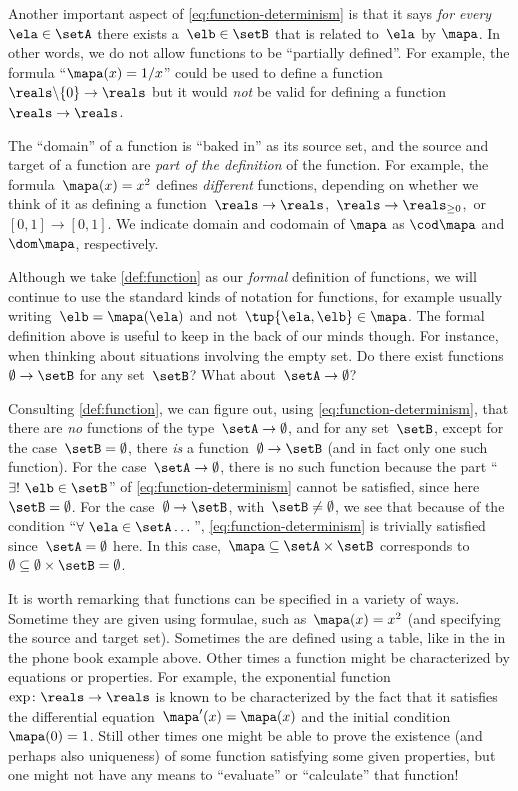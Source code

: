 Another important aspect of \cref{eq:function-determinism} is that it says \emph{for every}~$\ela \in \setA$ there exists a~$\elb \in \setB$ that is related to~$\ela$ by $\mapa$.
In other words, we do not allow functions to be ``partially defined''.
For example, the formula ``$\mapa(x) = 1/x$'' could be used to define a function~$\reals \backslash \{ 0 \} \to \reals$ but it would \emph{not} be valid for defining a function~$\reals \to \reals$.

\label{sec:domain-codomain}
The ``domain'' of a function is ``baked in'' as its source set, and the source and target of a function are \emph{part of the definition} of the function.
For example, the formula~$\mapa(x) = x^2$ defines \emph{different} functions, depending on whether we think of it as defining a function~$\reals \to \reals$,~$\reals \to \reals_{\geq 0}$,~or $[0,1] \to [0,1]$.
We indicate domain and codomain of $\mapa$ as $\cod\mapa$ and $\dom\mapa$, respectively.


Although we take \cref{def:function} as our \emph{formal} definition of functions, we will continue to use the standard kinds of notation for functions, for example usually writing~$\elb = \mapa(\ela)$ and not~$\tup{\ela, \elb} \in \mapa$.
The formal definition above is useful to keep in the back of our minds though.
For instance, when thinking about situations involving the empty set.
Do there exist functions~$\emptyset \to \setB$ for any set~$\setB$? What about~$\setA \to \emptyset$?

Consulting \cref{def:function}, we can figure out, using \cref{eq:function-determinism}, that there are \emph{no} functions of the type~$\setA \to \emptyset$, and for any set~$\setB$, except for the case~$\setB = \emptyset$, there \emph{is} a function~$\emptyset \to \setB$ (and in fact only one such function).
For the case~$\setA \to \emptyset$, there is no such function because the part ``$\exists ! \ \elb \in \setB$'' of \cref{eq:function-determinism} cannot be satisfied, since here~$\setB = \emptyset$.
For the case~$\emptyset \to \setB$, with~$\setB \neq \emptyset$, we see that because of the condition ``$\forall \ \ela \in \setA \dots$'', \cref{eq:function-determinism} is trivially satisfied since~$\setA = \emptyset$ here.
In this case,~$\mapa \subseteq \setA \times \setB$ corresponds to~$\emptyset \subseteq \emptyset \times \setB = \emptyset$.

It is worth remarking that functions can be specified in a variety of ways.
Sometime they are given using formulae, such as~$\mapa(x)=x^2$ (and specifying the source and target set).
Sometimes the are defined using a table, like in the in the phone book example above.
Other times a function might be characterized by equations or properties.
For example, the exponential function~$\exp \colon \reals \to \reals$ is known to be characterized by the fact that it satisfies the differential equation~$\mapa'(x) = \mapa(x)$ and the initial condition~$\mapa(0) =1$.
Still other times one might be able to prove the existence (and perhaps also uniqueness) of some function satisfying some given properties, but one might not have any means to ``evaluate'' or ``calculate'' that function!

